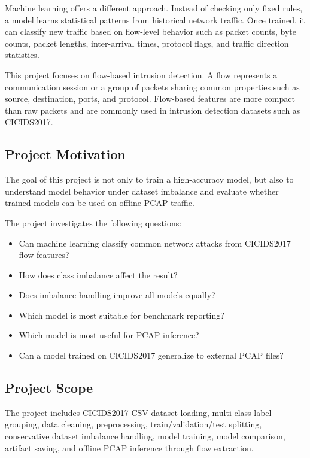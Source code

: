 \documentclass[12pt,a4paper]{article}
\begin{document}
Machine learning offers a different approach. Instead of checking only fixed rules, a model learns statistical patterns from historical network traffic. Once trained, it can classify new traffic based on flow-level behavior such as packet counts, byte counts, packet lengths, inter-arrival times, protocol flags, and traffic direction statistics.

This project focuses on flow-based intrusion detection. A flow represents a communication session or a group of packets sharing common properties such as source, destination, ports, and protocol. Flow-based features are more compact than raw packets and are commonly used in intrusion detection datasets such as CICIDS2017.

\subsection{Project Motivation}

The goal of this project is not only to train a high-accuracy model, but also to understand model behavior under dataset imbalance and evaluate whether trained models can be used on offline PCAP traffic.

The project investigates the following questions:

\begin{itemize}
    \item Can machine learning classify common network attacks from CICIDS2017 flow features?
    \item How does class imbalance affect the result?
    \item Does imbalance handling improve all models equally?
    \item Which model is most suitable for benchmark reporting?
    \item Which model is most useful for PCAP inference?
    \item Can a model trained on CICIDS2017 generalize to external PCAP files?
\end{itemize}

\subsection{Project Scope}

The project includes CICIDS2017 CSV dataset loading, multi-class label grouping, data cleaning, preprocessing, train/validation/test splitting, conservative dataset imbalance handling, model training, model comparison, artifact saving, and offline PCAP inference through flow extraction.
\end{document}
